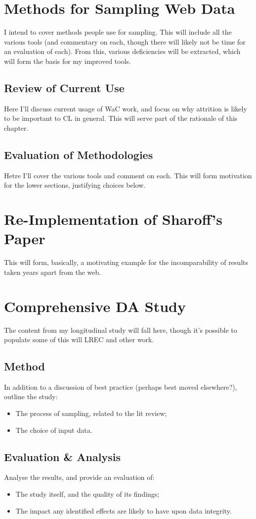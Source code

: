
\section{Methods for Sampling Web Data}
I intend to cover methods people use for sampling.  This will include all the various tools (and commentary on each, though there will likely not be time for an evaluation of each).  From this, various deficiencies will be extracted, which will form the basis for my improved tools.

\subsection{Review of Current Use}
Here I'll discuss current usage of WaC work, and focus on why attrition is likely to be important to CL in general.  This will serve part of the rationale of this chapter.

\subsection{Evaluation of Methodologies}
Hetre I'll cover the various tools and comment on each.  This will form motivation for the lower sections, justifying choices below.



\section{Re-Implementation of Sharoff's Paper}
This will form, basically, a motivating example for the incomparability of results taken years apart from the web.



\section{Comprehensive DA Study}
The content from my longitudinal study will fall here, though it's possible to populate some of this will LREC and other work.

\subsection{Method}
In addition to a discussion of best practice (perhaps best moved elsewhere?), outline the study:
\begin{itemize}
	\item The process of sampling, related to the lit review;
	\item The choice of input data.
\end{itemize}


\subsection{Evaluation \& Analysis}
Analyse the results, and provide an evaluation of:
\begin{itemize}
	\item The study itself, and the quality of its findings;
	\item The impact any identified effects are likely to have upon data integrity.
\end{itemize}


